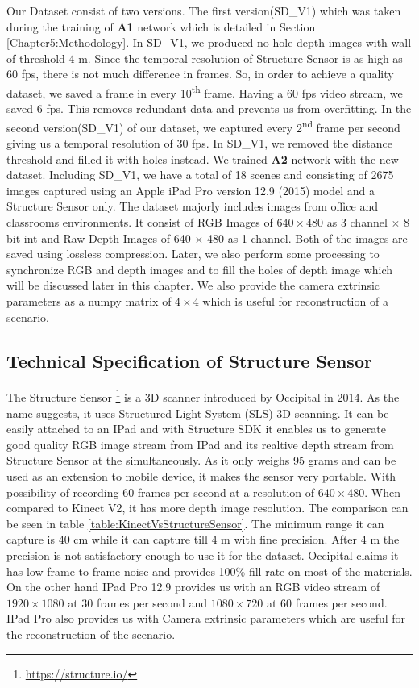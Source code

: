 Our Dataset consist of two versions. The first version(SD\_V1) which was taken during the training of \textbf{A1} network which is detailed in Section \ref{Chapter5:Methodology}. In SD\_V1, we produced no hole depth images with wall of threshold 4 m. Since the temporal resolution of Structure Sensor is as high as 60 fps, there is not much difference in frames. So, in order to achieve a quality dataset, we saved a frame in every 10\textsuperscript{th} frame. Having a 60 fps video stream, we saved 6 fps. This removes redundant data and prevents us from overfitting. In the second version(SD\_V1) of our dataset, we captured every 2\textsuperscript{nd} frame per second giving us a temporal resolution of 30 fps. In SD\_V1, we removed the distance threshold and filled it with holes instead. We trained \textbf{A2} network with the new dataset. Including SD\_V1, we have a total of 18 scenes and consisting of 2675 images captured using an Apple iPad Pro version 12.9 (2015) model and a Structure Sensor only. The dataset majorly includes images from office and classrooms environments. It consist of RGB Images of $640\times480$ as 3 channel $\times$ 8 bit int and Raw Depth Images of 640 $\times$ 480 as 1 channel. Both of the images are saved using lossless compression. Later, we also perform some processing to synchronize RGB and depth images and to fill the holes of depth image which will be discussed later in this chapter. We also provide the camera extrinsic parameters as a numpy matrix of $4\times4$ which is useful for reconstruction of a scenario.\\



\subsection{Technical Specification of Structure Sensor}
The Structure Sensor \footnote{\url{https://structure.io/}} is a 3D scanner introduced by Occipital in 2014. As the name suggests, it uses Structured-Light-System (SLS) 3D scanning\cite{Kalantari}. It can be easily attached to an IPad and with Structure SDK it enables us to generate good quality RGB image stream from IPad and its realtive depth stream from Structure Sensor at the simultaneously. As it only weighs 95 grams and can be used as an extension to mobile device, it makes the sensor very portable. With possibility of recording 60 frames per second at a resolution of $640\times480$\cite{Kalantari}. When compared to Kinect V2, it has more depth image resolution. The comparison can be seen in table \ref{table:KinectVsStructureSensor}. The minimum range it can capture is 40 cm while it can capture till 4 m with fine precision. After 4 m the precision is not satisfactory enough to use it for the dataset. Occipital claims it has low frame-to-frame noise and provides 100\% fill rate on most of the materials. On the other hand IPad Pro 12.9 provides us with an RGB video stream of $1920\times1080$ at 30 frames per second and $1080\times720$ at 60 frames per second. IPad Pro also provides us with Camera extrinsic parameters which are useful for the reconstruction of the scenario.\\

